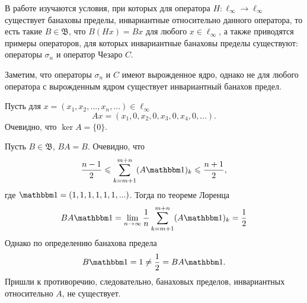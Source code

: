 В работе \cite{Semenov2010invariant} изучаются условия,
при которых для оператора $H:\ell_\infty\to \ell_\infty$ существует банаховы пределы,
инвариантные относительно данного оператора, то есть такие $B\in\mathfrak{B}$,
что $B(Hx) = Bx$ для любого $x\in\ell_\infty$,
а также приводятся примеры операторов, для которых инвариантные банаховы пределы существуют:
операторы $\sigma_n$ и оператор Чезаро $C$.

Заметим, что операторы $\sigma_n$ и $C$ имеют вырожденное ядро,
однако не для любого оператора с вырожденным ядром существует инвариантный банахов предел.

\begin{example}
	Пусть для $x = (x_1, x_2, ..., x_n, ...)\in \ell_\infty$
	\begin{equation*}
		Ax = (x_1, 0, x_2, 0, x_3, 0, x_4, 0, ...).
	\end{equation*}
	Очевидно, что $\ker A = \{0\}$.
\end{example}

Пусть $B\in\mathfrak{B}$, $BA = B$.
Очевидно, что
\begin{equation*}
	\frac{n-1}{2}\leqslant \sum_{k=m+1}^{m+n} (A\one)_k \leqslant \frac{n+1}{2},
\end{equation*}
где $\one = (1, 1, 1, 1, 1, 1, ...)$.
Тогда по теореме Лоренца
\begin{equation*}
	BA\one =
	\lim_{n\to\infty} \frac{1}{n}\sum_{k=m+1}^{m+n} (A\one)_k = \frac{1}{2}
\end{equation*}
Однако по определению банахова предела
\begin{equation*}
	B\one = 1 \neq \frac{1}{2} = BA\one.
\end{equation*}
Пришли к противоречию, следовательно, банаховых пределов, инвариантных относительно $A$, не существует.
